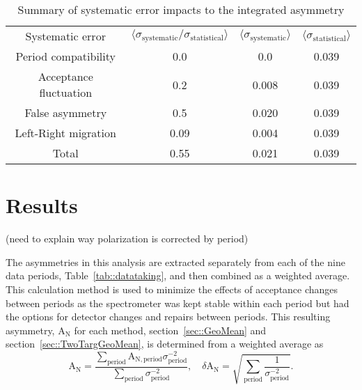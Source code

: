 \begin{table}[h!t]
  \centering
  \begin{tabular}{|c|c|c|c|}
    \hline
    \multirow{2}{*}{Systematic error}&
    \multirow{2}{*}{
      $\langle \sigma_{\mathrm{systematic}}/\sigma_{\mathrm{statistical}}
      \rangle$} &
    \multirow{2}{*}{$\langle \sigma_{\mathrm{systematic}} \rangle$} &
    \multirow{2}{*}{$\langle \sigma_{\mathrm{statistical}} \rangle$} \\
    
    & & & \\ \hline

    Period compatibility& 0.0 & 0.0 & 0.039\\ \hline

    Acceptance fluctuation& 0.2 & 0.008 & 0.039\\ \hline

    False asymmetry& 0.5 & 0.020 & 0.039\\ \hline

    Left-Right migration& 0.09 & 0.004 & 0.039\\ \hline

    Total& 0.55 & 0.021 & 0.039\\\hline
    
  \end{tabular}
  \caption{Summary of systematic error impacts to the integrated asymmetry}
  \label{tab::sysError}
\end{table}


\section{Results} \label{sec::lr_results}
(need to explain way polarization is corrected by period)

The asymmetries in this analysis are extracted separately from each of the nine
data periods, Table~\ref{tab::datataking}, and then combined as a weighted
average.  This calculation method is used to minimize the effects of acceptance
changes between periods as the spectrometer was kept stable within each period
but had the options for detector changes and repairs between periods.  This
resulting asymmetry, A$_{\mathrm{N}}$ for each method,
section~\ref{sec::GeoMean} and section~\ref{sec::TwoTargGeoMean}, is determined
from a weighted average as
\begin{equation}
  \label{equ::wAvg}
  \mathrm{A}_{\mathrm{N}} = \frac{
    \sum_{\mathrm{period}}
    \mathrm{A}_{\mathrm{N},\mathrm{period}}\sigma^{-2}_{\mathrm{period}}
  }{
    \sum_{\mathrm{period}} \sigma^{-2}_{\mathrm{period}}},
  \quad \delta \mathrm{A}_{\mathrm{N}} = \sqrt{\sum_{\mathrm{period}}
  \frac{1}{\sigma^{-2}_{\mathrm{period}}
  }}.
\end{equation}

